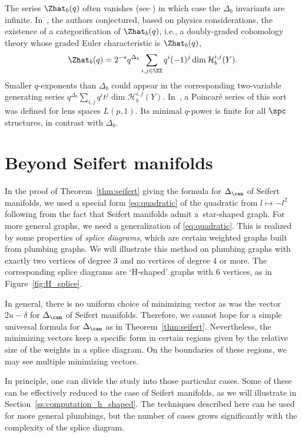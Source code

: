\documentclass[10pt,a4paper]{amsart}
\begin{document}
\begin{Remark}
 The series $\Zhat_b(q)$ often vanishes (see \cite[Corollary~3.7]{GKS23})
 in which case the $\Delta_b$ invariants are infinite. In~\cite{GPPV20}, the authors conjectured, based on physics considerations, the existence of a categorification of $\Zhat_b(q)$, i.e., a doubly-graded cohomology theory  whose graded Euler characteristic is $\Zhat_b(q)$,
 \[
 \Zhat_b(q) = 2^{-s} q^{\Delta_b} \sum_{i, j \in \ZZ} q^i (-1)^j \dim \mathcal{H}_b^{i,j}(Y).
 \]
 Smaller $q$-exponents than $\Delta_b$ could appear in the corresponding two-variable generating series $q^{\Delta_b}\sum_{i,j} q^i t^j \dim \mathcal{H}_b^{i,j}(Y)$. In~\cite{GPV16}, a Poincar\'e series of this sort was defined for lens spaces $L(p,1)$. Its minimal $q$-power is finite for all $\spc$ structures, in contrast with $\Delta_b$.
\end{Remark}

\section{Beyond Seifert manifolds}\label{s:H_shaped}

In the proof of Theorem~\ref{thm:seifert} giving the formula for $\Delta_{\can}$ of Seifert manifolds, we used a special form \eqref{eq:quadratic} of the quadratic from $l \mapsto -l^2$ following from the fact that Seifert manifolds admit a~star-shaped graph. For more general graphs, we need a generalization of \eqref{eq:quadratic}. This is realized by some properties of \emph{splice diagrams}, which are certain weighted graphs built from plumbing graphs. We will illustrate this method on plumbing graphs with exactly two vertices of degree 3 and no vertices of degree 4 or more. The corresponding splice diagrams are `H-shaped' graphs with 6 vertices, as in Figure~\ref{fig:H_splice}.

In general, there is no uniform choice of minimizing vector as was the vector $2u-\delta$ for $\Delta_{\can}$ of Seifert manifolds. Therefore, we cannot hope for a simple universal formula for $\Delta_{\can}$ as in Theorem~\ref{thm:seifert}. Nevertheless, the minimizing vectors keep a specific form in certain regions given by the relative size of the weights in a splice diagram. On the boundaries of these regions, we may see multiple minimizing vectors.

In principle, one can divide the study into those particular cases. Some of these can be effectively reduced to the case of Seifert manifolds, as we will illustrate in Section~\ref{ss:computation_h_shaped}. The techniques described here can be used for more general plumbings, but the number of cases grows significantly with the complexity of the splice diagram.
\end{document}

